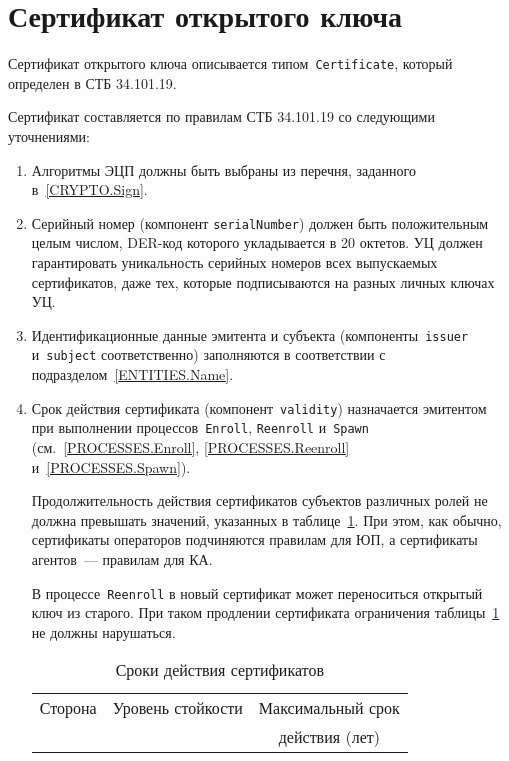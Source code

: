 \section{Сертификат открытого ключа}\label{FMT.Cert}

Сертификат открытого ключа описывается типом~\texttt{Certificate}, который 
определен в СТБ 34.101.19.

Сертификат составляется по правилам СТБ 34.101.19 со следующими уточнениями:
\begin{enumerate}

\item
Алгоритмы ЭЦП должны быть выбраны из перечня, заданного 
в~\ref{CRYPTO.Sign}.

\item
Серийный номер (компонент \texttt{serialNumber}) должен быть 
положительным целым числом, 
DER-код которого укладывается в 20 октетов.
%
УЦ должен гарантировать уникальность серийных 
номеров всех выпускаемых сертификатов, даже тех, которые 
подписываются на разных личных ключах УЦ.

\item
Идентификационные данные эмитента и субъекта (компоненты~\texttt{issuer} и~\texttt{subject} соответственно) заполняются в соответствии с подразделом~\ref{ENTITIES.Name}.

\item
Срок действия сертификата (компонент~\texttt{validity}) назначается 
эмитентом при выполнении 
процессов~\texttt{Enroll}, \texttt{Reenroll} и~\texttt{Spawn} 
(см.~\ref{PROCESSES.Enroll}, \ref{PROCESSES.Reenroll} 
и~\ref{PROCESSES.Spawn}).

Продолжительность действия сертификатов субъектов различных ролей
не должна превышать значений, указанных в таблице~\ref{Table.CERT.Validity}. 
%
При этом, как обычно, сертификаты операторов подчиняются правилам для ЮП, 
а сертификаты агентов~--- правилам для КА.

В процессе~\texttt{Reenroll} в новый сертификат может переноситься открытый 
ключ из старого. При таком продлении сертификата ограничения
таблицы~\ref{Table.CERT.Validity} не должны нарушаться.

\begin{table}
\caption{Сроки действия сертификатов}
\label{Table.CERT.Validity}
\begin{tabular}{|l|c|c|}
\hline
Сторона & Уровень стойкости & Максимальный срок\\
        &                   & действия (лет)\\
\hline
\hline


\end{tabular}
\end{table}
\end{enumerate}
